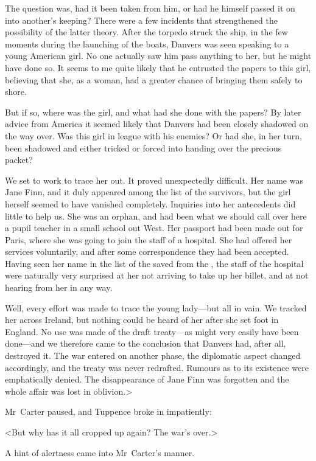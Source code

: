 The question was, had it been taken from him, or had he himself passed it on into another's keeping? There were a few incidents that strengthened the possibility of the latter theory. After the torpedo struck the ship, in the few moments during the launching of the boats, Danvers was seen speaking to a young American girl. No one actually saw him pass anything to her, but he might have done so. It seems to me quite likely that he entrusted the papers to this girl, believing that she, as a woman, had a greater chance of bringing them safely to shore.

But if so, where was the girl, and what had she done with the papers? By later advice from America it seemed likely that Danvers had been closely shadowed on the way over. Was this girl in league with his enemies? Or had she, in her turn, been shadowed and either tricked or forced into handing over the precious packet?

We set to work to trace her out. It proved unexpectedly difficult. Her name was Jane Finn, and it duly appeared among the list of the survivors, but the girl herself seemed to have vanished completely. Inquiries into her antecedents did little to help us. She was an orphan, and had been what we should call over here a pupil teacher in a small school out West. Her passport had been made out for Paris, where she was going to join the staff of a hospital. She had offered her services voluntarily, and after some correspondence they had been accepted. Having seen her name in the list of the saved from the , the staff of the hospital were naturally very surprised at her not arriving to take up her billet, and at not hearing from her in any way.

Well, every effort was made to trace the young lady—but all in vain. We tracked her across Ireland, but nothing could be heard of her after she set foot in England. No use was made of the draft treaty—as might very easily have been done—and we therefore came to the conclusion that Danvers had, after all, destroyed it. The war entered on another phase, the diplomatic aspect changed accordingly, and the treaty was never redrafted. Rumours as to its existence were emphatically denied. The disappearance of Jane Finn was forgotten and the whole affair was lost in oblivion.>

Mr~Carter paused, and Tuppence broke in impatiently:

<But why has it all cropped up again? The war's over.>

A hint of alertness came into Mr~Carter's manner.


